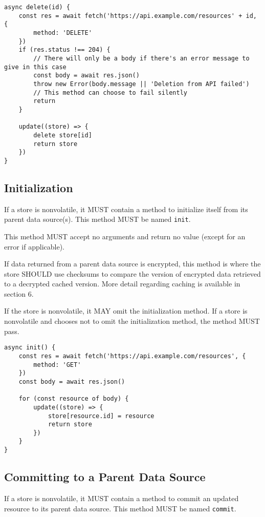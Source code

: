 \documentclass{article}
\begin{document}
\begin{lstlisting}[caption=Delete Method]
async delete(id) {
    const res = await fetch('https://api.example.com/resources' + id, {
        method: 'DELETE'
    })
    if (res.status !== 204) {
        // There will only be a body if there's an error message to give in this case
        const body = await res.json() 
        throw new Error(body.message || 'Deletion from API failed')
        // This method can choose to fail silently
        return
    }

    update((store) => {
        delete store[id]
        return store
    })
}
\end{lstlisting}

\subsection{Initialization}
If a store is nonvolatile, it MUST contain a method to initialize itself from its parent data source(s). This method MUST be named \verb|init|.

This method MUST accept no arguments and return no value (except for an error if applicable).

If data returned from a parent data source is encrypted, this method is where the store SHOULD use checksums to compare the version of encrypted data retrieved to a decrypted cached version. More detail regarding caching is available in section 6.

If the store is nonvolatile, it MAY omit the initialization method. If a store is nonvolatile and chooses not to omit the initialization method, the method MUST pass.

\begin{lstlisting}[caption=Initialization Method]
async init() {
    const res = await fetch('https://api.example.com/resources', {
        method: 'GET'
    })
    const body = await res.json()
    
    for (const resource of body) {
        update((store) => {
            store[resource.id] = resource
            return store
        })
    }
}
\end{lstlisting}

\subsection{Committing to a Parent Data Source}
\label{commit}
If a store is nonvolatile, it MUST contain a method to commit an updated resource to its parent data source. This method MUST be named \verb|commit|. 
\end{document}

